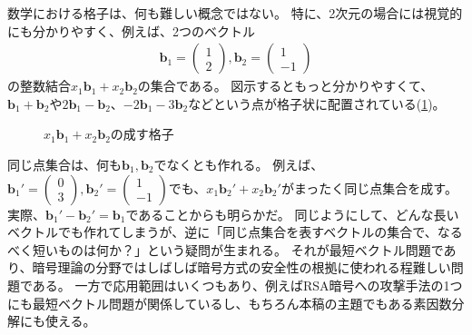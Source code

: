 数学における格子は、何も難しい概念ではない。
特に、2次元の場合には視覚的にも分かりやすく、例えば、2つのベクトル
\begin{align*}
\mathbf{b}_1 = \begin{pmatrix}
1\\
2
\end{pmatrix},
\mathbf{b}_2 = \begin{pmatrix}
1\\
-1
\end{pmatrix}
\end{align*}
の整数結合$x_1\mathbf{b}_1 + x_2\mathbf{b}_2$の集合である。
図示するともっと分かりやすくて、$\mathbf{b}_1 + \mathbf{b}_2$や$2\mathbf{b}_1 - \mathbf{b}_2$、$-2\mathbf{b}_1 - 3\mathbf{b}_2$などという点が格子状に配置されている(\ref{fig:lattice_example})。

\begin{figure}[htb]
\begin{center}
\caption{$x_1\mathbf{b}_1 + x_2\mathbf{b}_2$の成す格子}
\label{fig:lattice_example}
\end{center}
\end{figure}

同じ点集合は、何も$\mathbf{b}_1,\mathbf{b}_2$でなくとも作れる。
例えば、$\mathbf{b}_1'=\begin{pmatrix}0\\3\end{pmatrix},\mathbf{b}_2' = \begin{pmatrix}1\\-1\end{pmatrix}$でも、$x_1\mathbf{b}_2' + x_2\mathbf{b}_2'$がまったく同じ点集合を成す。
実際、$\mathbf{b}_1'-\mathbf{b}_2'=\mathbf{b}_1$であることからも明らかだ。
同じようにして、どんな長いベクトルでも作れてしまうが、逆に「同じ点集合を表すベクトルの集合で、なるべく短いものは何か？」という疑問が生まれる。
それが最短ベクトル問題であり、暗号理論の分野ではしばしば暗号方式の安全性の根拠に使われる程難しい問題である。
一方で応用範囲はいくつもあり、例えばRSA暗号への攻撃手法の1つにも最短ベクトル問題が関係しているし、もちろん本稿の主題でもある素因数分解にも使える。

